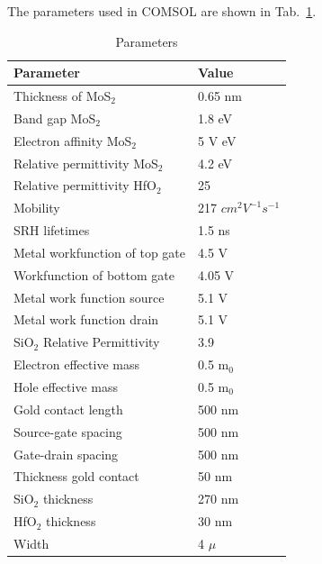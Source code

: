 \documentclass[12pt,a4paper,titlepage]{article}
\begin{document}
The parameters used in COMSOL are shown in Tab.~\ref{table:HfO2}.
\begin{table}[H]
	\centering
	\begin{tabular}{l l}
		\toprule
		\textbf{Parameter}             & \textbf{Value}       \\
		\midrule 
		Thickness of MoS$_2$           & 0.65 nm              \\ 
		Band gap MoS$_2$               & 1.8 eV               \\ 
		Electron affinity MoS$_2$      & 5 V eV               \\ 
		Relative permittivity MoS$_2$  & 4.2 eV               \\ 
		Relative permittivity HfO$_2$  & 25                   \\ 
		Mobility                       & 217 $cm^2V^{-1}s^{-1}$ \\ 
		SRH lifetimes                  & 1.5 ns               \\ 
		Metal workfunction of top gate & 4.5 V                \\ 
		Workfunction of bottom gate    & 4.05 V               \\ 
		Metal work function source     & 5.1 V                \\ 
		Metal work function drain      & 5.1 V                \\ 
		SiO$_2$ Relative Permittivity  & 3.9                  \\ 
		Electron effective mass        & 0.5 m$_0$            \\ 
		Hole effective mass            & 0.5 m$_0$            \\ 
		Gold contact length            & 500 nm               \\ 
		Source-gate spacing            & 500 nm               \\ 
		Gate-drain spacing             & 500 nm               \\ 
		Thickness gold contact         & 50 nm                \\ 
		SiO$_2$ thickness              & 270 nm               \\ 
		HfO$_2$ thickness              & 30 nm               \\ 
		Width                          & 4 $\mu$              \\
		\bottomrule
	\end{tabular}
	\caption{Parameters}
	\label{table:HfO2}
\end{table}
\end{document}
